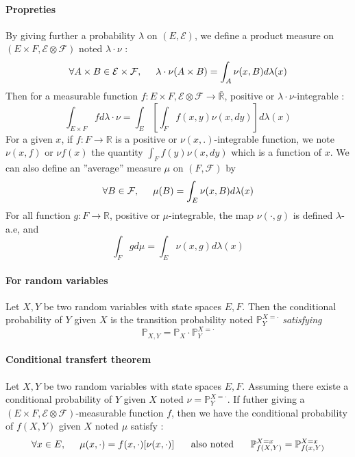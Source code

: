\documentclass[a4paper,10pt]{article}
\begin{document}
\paragraph{Propreties}
By giving further a probability $\lambda$ on $(E,\mathcal{E})$, we define a product measure on $(E\times F, \mathcal{E} \otimes \mathcal{F})$ noted $\lambda \cdot \nu$ :
\[
  \forall A\times B \in \mathcal{E}\times \mathcal{F}, \hspace{5mm} \lambda \cdot \nu(A\times B) = \int_A \nu(x,B)d\lambda(x)
\]
Then for a measurable function $f : E\times F, \mathcal{E}\otimes \mathcal{F} \longrightarrow  \bar{\mathbb{R}}$, positive or $\lambda\cdot\nu$-integrable :
\[
\int_{E\times F} f d\lambda \cdot \nu =
\int_E [ \int_F f(x,y) \nu(x,dy)  ] d\lambda(x)
\]
For a given $x$, if $f:F\longrightarrow \mathbb{R}$ is a positive or $\nu(x,.)$-integrable function, we note $\nu(x,f)$ or $\nu f(x)$ the quantity $\int_F f(y) \nu(x,dy) $ which is a function of $x$. We can also define an ''average'' measure $\mu$ on $(F,\mathcal{F})$ by
\[
 \forall B \in \mathcal{F}, \hspace{5mm} \mu(B) = \int_E \nu(x,B)d\lambda (x)
\]
For all function $g:F\longrightarrow \mathbb{R}$, positive or $\mu$-integrable, the map $\nu(\cdot, g)$ is defined $\lambda$-a.e, and 
\[
\int_F gd\mu = \int_E \nu(x,g) d\lambda(x)
\]
\paragraph{For random variables} Let $X,Y$ be two random variables with state spaces $E,F$. Then the conditional probability of $Y$ given $X$ is the transition probability noted $\mathbb{P}^{X=\cdot}_Y$ \textit{satisfying} 
\[
\mathbb{P}_{X,Y} =\mathbb{P}_X\cdot \mathbb{P}^{X=\cdot}_Y
\]
\paragraph{Conditional transfert theorem} Let $X,Y$ be two random variables with state spaces $E,F$. Assuming there existe a conditional probability of $Y$ given $X$ noted $\nu= \mathbb{P}^{X=\cdot}_Y$. If futher giving a $(E\times F, \mathcal{E}\otimes \mathcal{F})$-measurable function $f$, then we have the conditional probability of $f(X,Y)$ given $X$ noted $\mu$ satisfy :
\[
\forall x\in E, \hspace{5mm} \mu(x,\cdot) = f(x,\cdot)[\nu(x,\cdot)] \hspace{5mm} \text{ also noted } \hspace{5mm}
\mathbb{P}^{X=x}_{f(X,Y)} = \mathbb{P}^{X=x}_{f(x,Y)}
\]
\end{document}
